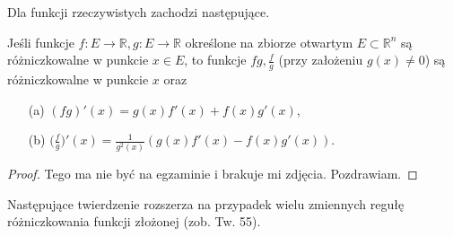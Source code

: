 \documentclass[leqno]{article}
\begin{document}
\begin{justify}
Dla funkcji rzeczywistych zachodzi następujące.

\begin{theorem}
{
    Jeśli funkcje $ f : E \to \mathbb{R}, g : E \to \mathbb{R}$ określone na zbiorze otwartym $E \subset \mathbb{R}^n$ są 
    różniczkowalne w punkcie $x \in E$, to funkcje $fg, \frac{f}{g}$ (przy założeniu $g(x) \neq 0$) są 
    różniczkowalne w punkcie $x$ oraz 
    \begin{itemize}
        \item [(a)] ${(fg)}'(x) = g(x)f'(x) + f(x)g'(x)$,
        \item [(b)] $\Big(\frac{f}{g}\Big)'(x) = \frac{1}{g^2(x)}(g(x)f'(x) - f(x)g'(x))$.
    \end{itemize}
}
\end{theorem}

\begin{proof}
    Tego ma nie być na egzaminie i brakuje mi zdjęcia. Pozdrawiam.
\end{proof}

Następujące twierdzenie rozszerza na przypadek wielu zmiennych regułę różniczkowania funkcji złożonej (zob. Tw. 55).


\end{justify}
\end{document}
